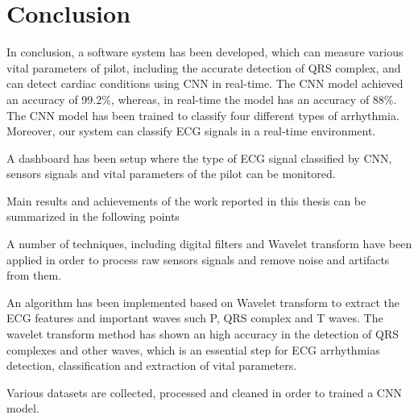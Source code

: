 \chapter{Conclusion}

In conclusion, a software system has been developed, which can measure various vital parameters of pilot, including the accurate detection of QRS complex, and can detect cardiac conditions using CNN in real-time. The CNN model achieved an accuracy of 99.2\%, whereas, in real-time the model has an accuracy of 88\%. The CNN model has been trained to classify four different types of arrhythmia. Moreover, our system can classify ECG signals in a real-time environment.

A dashboard has been setup where the type of ECG signal classified by CNN, sensors signals and vital parameters of the pilot can be monitored. 

Main results and achievements of the work reported in this thesis can be summarized in the following points


A number of techniques, including digital filters and Wavelet transform have been applied in order to process raw sensors signals and remove noise and artifacts from them.


An algorithm has been implemented based on Wavelet transform to extract the ECG features and important waves such P, QRS complex and T waves. The wavelet transform method has shown an high accuracy in the detection of QRS complexes and other waves, which is an essential step for ECG arrhythmias detection, classification and extraction of vital parameters.

Various datasets are collected, processed and cleaned in order to trained a CNN model.